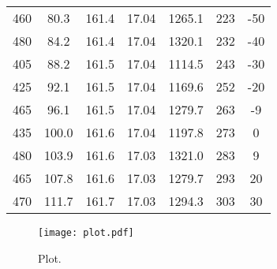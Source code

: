 \begin{table}
\begin{tabular}{S S S S | S S S}
    460 &  80.3 &  161.4  & 17.04 & 1265.1 & 223 & -50  \\
    480 &  84.2 &  161.4  & 17.04 & 1320.1 & 232 & -40  \\
    405 &  88.2 &  161.5  & 17.04 & 1114.5 & 243 & -30  \\
    425 &  92.1 &  161.5  & 17.04 & 1169.6 & 252 & -20  \\
    465 &  96.1 &  161.5  & 17.04 & 1279.7 & 263 & -9   \\
    435 & 100.0 &  161.6  & 17.04 & 1197.8 & 273 & 0    \\
    480 & 103.9 &  161.6  & 17.03 & 1321.0 & 283 & 9    \\
    465 & 107.8 &  161.6  & 17.03 & 1279.7 & 293 & 20   \\
    470 & 111.7 &  161.7  & 17.03 & 1294.3 & 303 & 30   \\
    \bottomrule
  \end{tabular}
\end{table}

\begin{figure}
  \centering
  \texttt{[image: plot.pdf]}
  \caption{Plot.}
  \label{fig:plot}
\end{figure}

